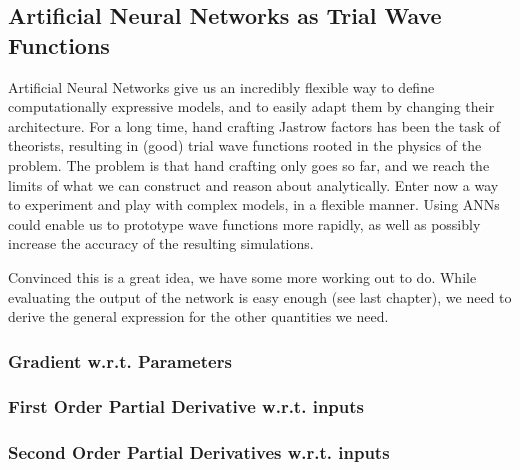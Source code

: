 \documentclass[Thesis.tex]{subfiles}
\begin{document}
\subsection{Artificial Neural Networks as Trial Wave Functions}

Artificial Neural Networks give us an incredibly flexible way to define
computationally expressive models, and to easily adapt them by changing their
architecture. For a long time, hand crafting Jastrow factors has been the task
of theorists, resulting in (good) trial wave functions rooted in the physics of
the problem. The problem is that hand crafting only goes so far, and we reach
the limits of what we can construct and reason about analytically. Enter now a
way to experiment and play with complex models, in a flexible manner. Using ANNs
could enable us to prototype wave functions more rapidly, as well as possibly
increase the accuracy of the resulting simulations.

Convinced this is a great idea, we have some more working out to do. While
evaluating the output of the network is easy enough (see last chapter), we need
to derive the general expression for the other quantities we need.


\subsubsection{Gradient w.r.t. Parameters}

\subsubsection{First Order Partial Derivative w.r.t. inputs}

\subsubsection{Second Order Partial Derivatives w.r.t. inputs}
\end{document}
